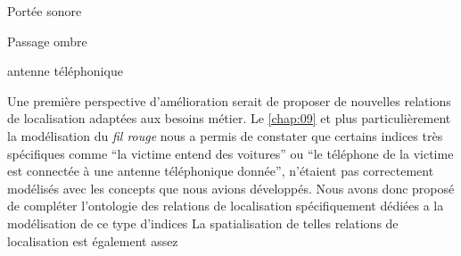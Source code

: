 Portée sonore

Passage ombre

antenne téléphonique

Une première perspective d'amélioration serait de proposer de
nouvelles relations de localisation adaptées aux besoins métier. Le
\autoref{chap:09} et plus particulièrement la modélisation du
\emph{fil rouge} nous a permis de constater que certains indices très
spécifiques comme \enquote{la victime entend des voitures} ou
\enquote{le téléphone de la victime est connectée à une antenne
  téléphonique donnée}, n'étaient pas correctement modélisés avec les
concepts que nous avions développés.
%
Nous avons donc proposé de compléter l'ontologie des relations de
localisation spécifiquement dédiées a la modélisation de ce type
d'indices
%
La spatialisation de telles relations de localisation est également
assez 


